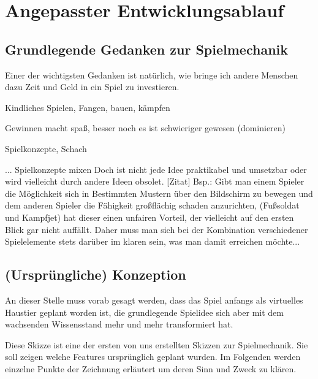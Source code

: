 \chapter{Angepasster Entwicklungsablauf}
\label{cha:angepasster_entwicklungsablauf}

\section{Grundlegende Gedanken zur Spielmechanik}
Einer der wichtigsten Gedanken ist natürlich, wie bringe ich andere Menschen dazu Zeit und Geld in ein Spiel zu investieren. 

Kindliches Spielen, Fangen, bauen, kämpfen

Gewinnen macht spaß, besser noch es ist schwieriger gewesen (dominieren)

Spielkonzepte, Schach 

...
Spielkonzepte mixen
Doch ist nicht jede Idee praktikabel und umsetzbar oder wird vielleicht durch andere Ideen obsolet. [Zitat] Bsp.: Gibt man einem Spieler die Möglichkeit sich in Bestimmten Mustern über den Bildschirm zu bewegen und dem anderen Spieler die Fähigkeit großflächig schaden anzurichten, (Fußsoldat und Kampfjet) hat dieser einen unfairen Vorteil, der vielleicht auf den ersten Blick gar nicht auffällt. Daher muss man sich bei der Kombination verschiedener Spielelemente stets darüber im klaren sein, was man damit erreichen möchte...

\section{(Ursprüngliche) Konzeption}
An dieser Stelle muss vorab gesagt werden, dass das Spiel anfangs als virtuelles Haustier geplant worden ist, die grundlegende Spielidee sich aber mit dem wachsenden Wissensstand mehr und mehr transformiert hat.
 
Diese Skizze ist eine der ersten von uns erstellten Skizzen zur Spielmechanik. Sie soll zeigen welche Features ursprünglich geplant wurden. Im Folgenden werden einzelne Punkte der Zeichnung erläutert um deren Sinn und Zweck zu klären.

